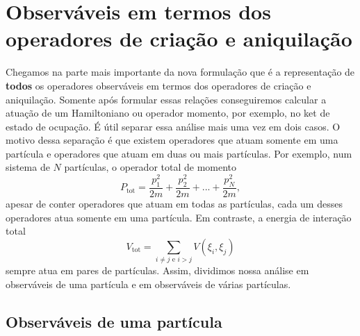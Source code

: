 \documentclass{article}
\begin{document}
\section{Observáveis em termos dos operadores de criação e aniquilação}

Chegamos na parte mais importante da nova formulação que é a representação de \textbf{todos} os operadores observáveis em termos dos operadores de criação e aniquilação. Somente após formular essas relações conseguiremos calcular a atuação de um Hamiltoniano ou operador momento, por exemplo, no ket de estado de ocupação. É útil separar essa análise mais uma vez em dois casos. O motivo dessa separação é que existem operadores que atuam somente em uma partícula e operadores que atuam em duas ou mais partículas. Por exemplo, num sistema de $N$ partículas, o operador total de momento
\begin{equation}
    P_{\text{tot}} = \frac{p_1^2}{2m} + \frac{p_2^2}{2m} + ... + \frac{p_N^2}{2m},
\end{equation}
apesar de conter operadores que atuam em todas as partículas, cada um desses operadores atua somente em uma partícula. Em contraste, a energia de interação total
\begin{equation}
    V_{\text{tot}} = \sum_{i\neq j \text{ e } i> j} V(\xi_i,\xi_j)
\end{equation}
sempre atua em pares de partículas. Assim, dividimos nossa análise em observáveis de uma partícula e em observáveis de várias partículas.

\subsection{Observáveis de uma partícula}
\end{document}
